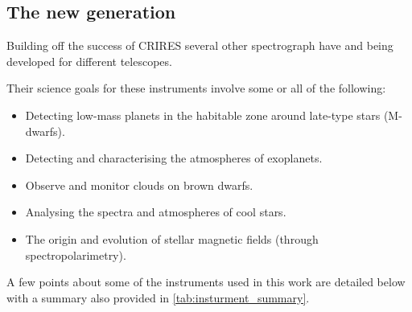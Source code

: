 \subsection{The new generation}
\label{subsec:new_generation}
Building off the success of CRIRES several other \nir{} spectrograph have and being developed for different telescopes.

Their science goals for these instruments involve some or all of the following:

\begin{itemize}
\item Detecting low-mass planets in the habitable zone around late-type stars (M-dwarfs).
\item Detecting and characterising the atmospheres of exoplanets.
\item Observe and monitor clouds on brown dwarfs.
\item Analysing the spectra and atmospheres of cool stars.
\item The origin and evolution of stellar magnetic fields (through spectropolarimetry).
\end{itemize}

A few points about some of the \nir{} instruments used in this work are detailed below with a summary also provided in \cref{tab:insturment_summary}.

